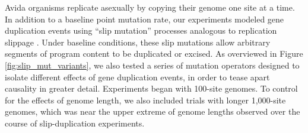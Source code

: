 Avida organisms replicate asexually by copying their genome one site at a time.
In addition to a baseline point mutation rate, our experiments
modeled gene duplication events using ``slip mutation'' processes analogous to replication slippage \citep{bzymek_instability_2001}.
Under baseline conditions, these slip mutations allow arbitrary segments of program content to be duplicated or excised.
As overviewed in Figure \ref{fig:slip_mut_variants}, we also tested a series of mutation operators designed to isolate different effects of gene duplication events, in order to tease apart causality in greater detail.
Experiments began with 100-site genomes.
To control for the effects of genome length, we also included trials with longer 1,000-site genomes, which was near the upper extreme of genome lengths observed over the course of slip-duplication experiments.



